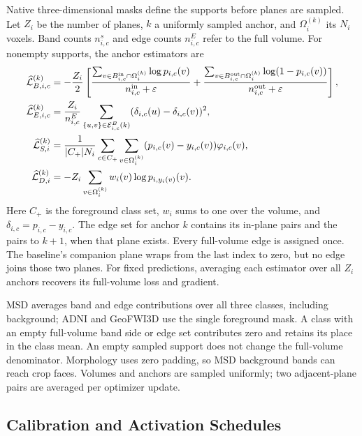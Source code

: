 \documentclass[12pt,a4paper]{article}
\begin{document}
Native three-dimensional masks define the supports before planes are
sampled. Let $Z_i$ be the number of planes, $k$ a uniformly sampled
anchor, and $\Omega_i^{(k)}$ its $N_i$ voxels. Band counts $n_{i,c}^s$
and edge counts $n_{i,c}^E$ refer to the full volume. For nonempty
supports, the anchor estimators are
\begin{align}
\widehat{\mathcal L}_{B,i,c}^{(k)}
 &=-\frac{Z_i}{2}\left[
 \frac{\sum_{v\in B_{i,c}^{\rm in}\cap\Omega_i^{(k)}}\log p_{i,c}(v)}{n_{i,c}^{\rm in}+\varepsilon}
 +\frac{\sum_{v\in B_{i,c}^{\rm out}\cap\Omega_i^{(k)}}\log(1-p_{i,c}(v))}{n_{i,c}^{\rm out}+\varepsilon}
 \right],\label{eq:medsam-sampled-band-loss}\\
\widehat{\mathcal L}_{E,i,c}^{(k)}
 &=\frac{Z_i}{n_{i,c}^E}\sum_{\{u,v\}\in\mathcal E_{i,c}^B(k)}
 (\delta_{i,c}(u)-\delta_{i,c}(v))^2,\label{eq:medsam-sampled-edge-loss}\\
\widehat{\mathcal L}_{S,i}^{(k)}
 &=\frac{1}{|C_+|N_i}\sum_{c\in C_+}\sum_{v\in\Omega_i^{(k)}}
 (p_{i,c}(v)-y_{i,c}(v))\varphi_{i,c}(v),\label{eq:medsam-sampled-sdf}\\
\widehat{\mathcal L}_{D,i}^{(k)}
 &=-Z_i\sum_{v\in\Omega_i^{(k)}}w_i(v)\log p_{i,y_i(v)}(v).
 \label{eq:medsam-sampled-depth}
\end{align}
Here $C_+$ is the foreground class set, $w_i$ sums to one over the
volume, and $\delta_{i,c}=p_{i,c}-y_{i,c}$. The edge set for anchor $k$
contains its in-plane pairs and the pairs to $k+1$, when that plane
exists. Every full-volume edge is assigned once. The baseline's
companion plane wraps from the last index to zero, but no edge joins
those two planes. For fixed predictions, averaging each estimator over
all $Z_i$ anchors recovers its full-volume loss and gradient.

MSD averages band and edge contributions over all three classes,
including background; ADNI and GeoFWI3D use the single foreground
mask. A class with an empty full-volume band side or edge set contributes
zero and retains its place in the class mean. An empty sampled support
does not change the full-volume denominator. Morphology uses zero
padding, so MSD background bands can reach crop faces. Volumes and
anchors are sampled uniformly; two adjacent-plane pairs are averaged
per optimizer update.

\subsection{Calibration and Activation Schedules}
\label{sec:detailed-calibration}
\end{document}
